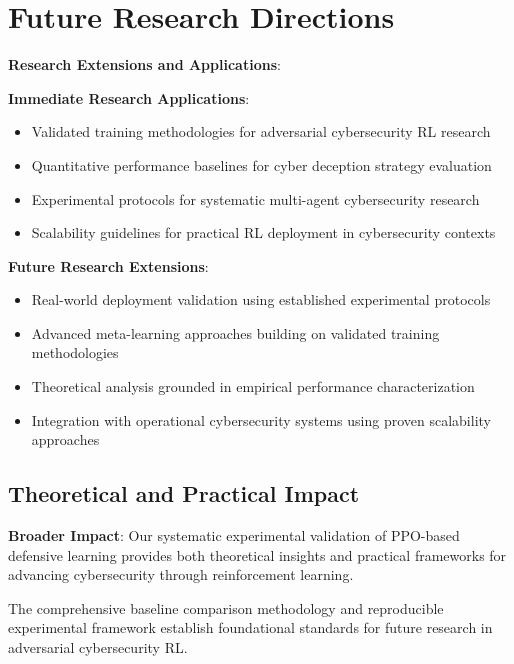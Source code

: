 \documentclass[11pt]{article}
\begin{document}
\section{Future Research Directions}

\begin{research}
\textbf{Research Extensions and Applications}:

\textbf{Immediate Research Applications}:
\begin{itemize}
\item Validated training methodologies for adversarial cybersecurity RL research
\item Quantitative performance baselines for cyber deception strategy evaluation
\item Experimental protocols for systematic multi-agent cybersecurity research
\item Scalability guidelines for practical RL deployment in cybersecurity contexts
\end{itemize}

\textbf{Future Research Extensions}:
\begin{itemize}
\item Real-world deployment validation using established experimental protocols
\item Advanced meta-learning approaches building on validated training methodologies
\item Theoretical analysis grounded in empirical performance characterization
\item Integration with operational cybersecurity systems using proven scalability approaches
\end{itemize}
\end{research}

\subsection{Theoretical and Practical Impact}

\begin{foundation}
\textbf{Broader Impact}: Our systematic experimental validation of PPO-based defensive learning provides both theoretical insights and practical frameworks for advancing cybersecurity through reinforcement learning.

The comprehensive baseline comparison methodology and reproducible experimental framework establish foundational standards for future research in adversarial cybersecurity RL.
\end{foundation}
\end{document}
